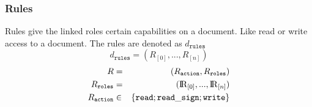 \subsubsection{Rules}
Rules give the linked roles certain capabilities on a document. Like read or write access to a document. The rules are denoted as $d_\mathtt{rules}$
\begin{equation}
 d_\mathtt{rules}  =  (R_{[0]}, ..., R_{[n]})
\end{equation}
\begin{eqnarray}
R & = & (R_{\mathtt{action}}, R_{\mathtt{roles}})\\
R_{\mathtt{roles}} & = & ({\rm I\!R}_{[0]}, ..., {\rm I\!R}_{[n]}) \\
R_{\mathtt{action}} & \in & \{\mathtt{read; read\_sign;write}\} \\
\end{eqnarray}


